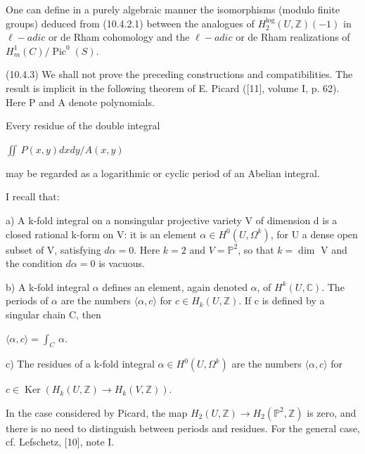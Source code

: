 \documentclass[11pt,twoside]{article}
\newcommand{\DFormula}[1]{%
  \par\smallskip\noindent\hspace*{0pt}\(\displaystyle #1\)\par\smallskip
}
\begin{document}
One can define in a purely algebraic manner the isomorphisms (modulo finite groups) deduced from (10.4.2.1) between the analogues of \(H_{2}^{\operatorname{log}}(U,\mathbb{Z})(−1)\) in \(\ell -adic\) or de Rham cohomology and the \(\ell -adic\) or de Rham realizations of \(H_{m}^{1}(C)/\operatorname{Pic}^{0}(S)\).\par
\par\medskip
(10.4.3) We shall not prove the preceding constructions and compatibilities. The result is implicit in the following theorem of E. Picard ([11], volume I, p. 62). Here P and A denote polynomials.\par
\par\medskip
Every residue of the double integral\par
\par\medskip
\DFormula{∬\,P(x,y)dxdy/A(x,y)}
\par\medskip
may be regarded as a logarithmic or cyclic period of an Abelian integral.\par
\par\medskip
I recall that:\par
\par\medskip
a) A k-fold integral on a nonsingular projective variety V of dimension d is a closed rational k-form on V: it is an element \(\alpha \in H^{0}(U,\Omega ^{k})\), for U a dense open subset of V, satisfying \(d\alpha =0\). Here \(k=2\) and \(V=ℙ^{2}\), so that \(k=\operatorname{dim}\) V and the condition \(d\alpha =0\) is vacuous.\par
\par\medskip
b) A k-fold integral \(\alpha \) defines an element, again denoted \(\alpha \), of \(H^{k}(U,\mathbb{C})\). The periods of \(\alpha \) are the numbers \(⟨\alpha ,c⟩\) for \(c\in H_{k}(U,\mathbb{Z})\). If c is defined by a singular chain C, then\par
\par\medskip
\DFormula{⟨\alpha ,c⟩=∫_{C}\,\alpha .}
\par\medskip
c) The residues of a k-fold integral \(\alpha \in H^{0}(U,\Omega ^{k})\) are the numbers \(⟨\alpha ,c⟩\) for\par
\par\medskip
\DFormula{c\in \operatorname{Ker}(H_{k}(U,\mathbb{Z})\to H_{k}(V,\mathbb{Z})).}
\par\medskip
In the case considered by Picard, the map \(H_{2}(U,\mathbb{Z})\to H_{2}(ℙ^{2},\mathbb{Z})\) is zero, and there is no need to distinguish between periods and residues. For the general case, cf. Lefschetz, [10], note I.\par
\end{document}
